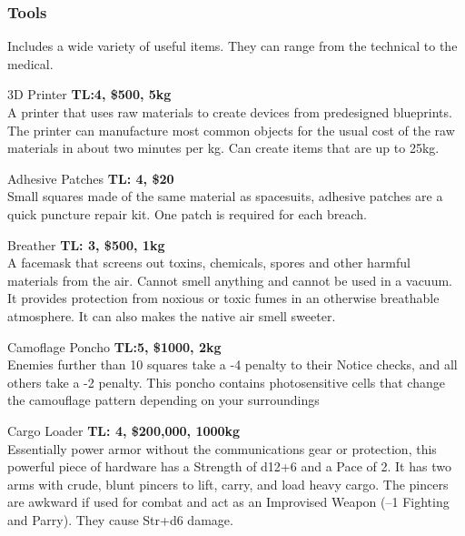 \subsubsection{Tools}

Includes a wide variety of useful items. They can range from the technical to the medical.

\begin{genericsection}{3D Printer}
\textbf{TL:4, \$500, 5kg}\\
A printer that uses raw materials to create devices from predesigned blueprints. The printer can manufacture most common objects for the usual cost of the raw materials in about two minutes per kg. Can create items that are up to 25kg.
\end{genericsection}

\begin{genericsection}{Adhesive Patches}
\textbf{TL: 4, \$20}\\
Small squares made of the same material as spacesuits, adhesive patches are a quick puncture repair kit. One patch is required for each breach.
\end{genericsection}

\begin{genericsection}{Breather}
\textbf{TL: 3, \$500, 1kg}\\
A facemask that screens out toxins, chemicals, spores and other harmful materials from the air. Cannot smell anything and cannot be used in a vacuum.	It provides protection from noxious or toxic fumes in an otherwise breathable atmosphere. It can also makes the native air smell sweeter.
\end{genericsection}

\begin{genericsection}{Camoflage Poncho}
\textbf{TL:5, \$1000, 2kg}\\
Enemies further than 10 squares take a -4 penalty to their Notice checks, and all others take a -2 penalty. This poncho contains photosensitive cells that change the camouflage pattern depending on your surroundings
\end{genericsection}

\begin{genericsection}{Cargo Loader}
\textbf{TL: 4, \$200,000, 1000kg}\\
Essentially power armor without the communications gear or protection, this powerful piece of hardware has a Strength of d12+6 and a Pace of 2. It has two arms with crude, blunt pincers to lift, carry, and load heavy cargo. The pincers are awkward if used for combat and act as an Improvised Weapon (–1 Fighting and Parry). They cause Str+d6 damage.
\end{genericsection}

